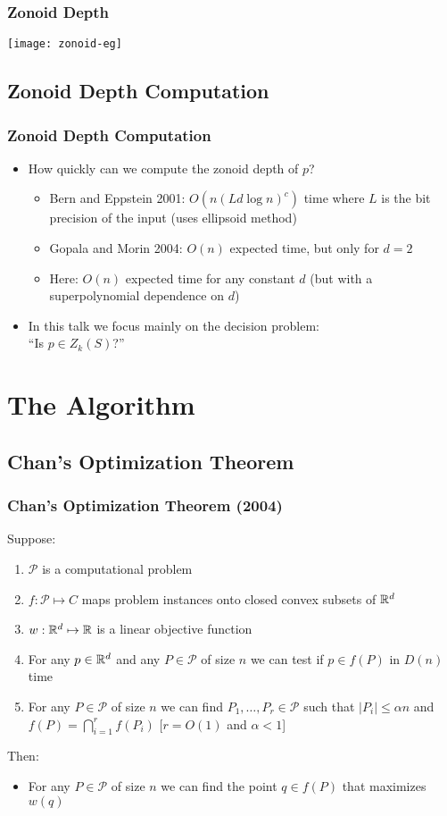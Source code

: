 \documentclass{beamer}
\begin{document}
\frame
{
    \frametitle{Zonoid Depth}
    \begin{center}
     \texttt{[image: zonoid-eg]}
    \end{center}
}


\subsection{Zonoid Depth Computation}
\frame
{
  \frametitle{Zonoid Depth Computation}
  \begin{itemize}
  \item<1-> How quickly can we compute the zonoid depth of $p$?
     \begin{itemize}  
       \item<2-> Bern and Eppstein 2001:  $O(n(Ld\log n)^c)$ time where $L$
            is the bit precision of the input  (uses ellipsoid method)
       \item<3-> Gopala and Morin 2004: $O(n)$ expected time, but only
            for $d=2$
       \item<4-> Here: $O(n)$ expected time for any constant $d$ (but
            with a superpolynomial dependence on $d$)
     \end{itemize}
     \item<5-> In this talk we focus mainly on the decision 
          problem:  \\ ``Is $p\in Z_k(S)$?''
  \end{itemize}
}

\section{The Algorithm}

\subsection{Chan's Optimization Theorem}
\frame
{
  \frametitle{Chan's Optimization Theorem (2004)}
  Suppose:  
  \begin{enumerate}
   \item<1-> $\mathcal{P}$ is a computational problem
   \item<2-> $f:\mathcal{P}\mapsto C$ maps problem instances onto closed 
         convex subsets of $\mathbb{R}^d$
   \item<3-> $w:\mathbb{R}^d\mapsto \mathbb{R}$ is a linear objective function
   \item<4-> For any $p\in\mathbb{R}^d$ and any $P\in\mathcal{P}$ of size $n$ we
         can test if $p\in f(P)$ in $D(n)$ time
   \item<5-> For any $P\in\mathcal{P}$ of size $n$ we can find
         $P_1,\ldots, P_r\in\mathcal{P}$ such that $|P_i|\le\alpha n$ 
         and $f(P)=\bigcap_{i=1}^r f(P_i)$ \hfill{[$r=O(1)$ and $\alpha<1$]}
  \end{enumerate}
  Then:
  \begin{itemize}
    \item<6-> For any $P\in\mathcal{P}$ of size $n$ we can find the point
    $q\in f(P)$ that maximizes $w(q)$
  \end{itemize}
} 
\end{document}
